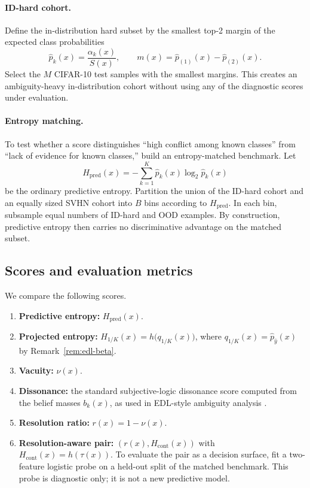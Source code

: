 \documentclass[11pt]{article}
\newcommand{\1}{\mathbf{1}}
\newcommand{\hbin}{h}
\begin{document}
\paragraph{ID-hard cohort.}
Define the in-distribution hard subset by the smallest top-2 margin of the expected class probabilities
\[
\hat p_k(x)=\frac{\alpha_k(x)}{S(x)},
\qquad
m(x)=\hat p_{(1)}(x)-\hat p_{(2)}(x).
\]
Select the $M$ CIFAR-10 test samples with the smallest margins. This creates an ambiguity-heavy in-distribution cohort without using any of the diagnostic scores under evaluation.

\paragraph{Entropy matching.}
To test whether a score distinguishes “high conflict among known classes” from “lack of evidence for known classes,” build an entropy-matched benchmark. Let
\[
H_{\mathrm{pred}}(x)=-\sum_{k=1}^K \hat p_k(x)\log_2\hat p_k(x)
\]
be the ordinary predictive entropy. Partition the union of the ID-hard cohort and an equally sized SVHN cohort into $B$ bins according to $H_{\mathrm{pred}}$. In each bin, subsample equal numbers of ID-hard and OOD examples. By construction, predictive entropy then carries no discriminative advantage on the matched subset.

\subsection{Scores and evaluation metrics}

We compare the following scores.
\begin{enumerate}[leftmargin=1.5em]
    \item \textbf{Predictive entropy:} $H_{\mathrm{pred}}(x)$.
    \item \textbf{Projected entropy:} $H_{1/K}(x)=\hbin\bigl(q_{1/K}(x)\bigr)$, where $q_{1/K}(x)=\hat p_{\hat y}(x)$ by Remark~\ref{rem:edl-beta}.
    \item \textbf{Vacuity:} $\nu(x)$.
    \item \textbf{Dissonance:} the standard subjective-logic dissonance score computed from the belief masses $b_k(x)$, as used in EDL-style ambiguity analysis \citep{Josang16,AguilarRaducanuRadevaVanDeWeijer23}.
    \item \textbf{Resolution ratio:} $r(x)=1-\nu(x)$.
    \item \textbf{Resolution-aware pair:} $(r(x),H_{\mathrm{cont}}(x))$ with $H_{\mathrm{cont}}(x)=\hbin(\tau(x))$. To evaluate the pair as a decision surface, fit a two-feature logistic probe on a held-out split of the matched benchmark. This probe is diagnostic only; it is not a new predictive model.
\end{enumerate}
\end{document}
